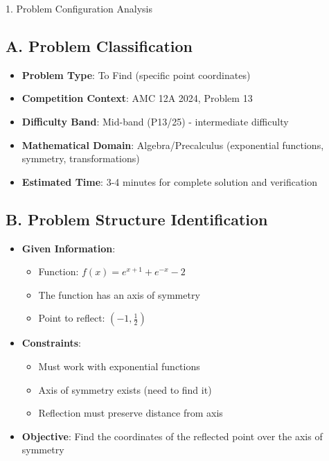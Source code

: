 \documentclass[12pt]{article}
\begin{document}
\begin{configbox}{1. Problem Configuration Analysis}

\subsection*{A. Problem Classification}
\begin{itemize}[leftmargin=*]
    \item \textbf{Problem Type}: To Find (specific point coordinates)
    \item \textbf{Competition Context}: AMC 12A 2024, Problem 13
    \item \textbf{Difficulty Band}: Mid-band (P13/25) - intermediate difficulty
    \item \textbf{Mathematical Domain}: Algebra/Precalculus (exponential functions, symmetry, transformations)
    \item \textbf{Estimated Time}: 3-4 minutes for complete solution and verification
\end{itemize}

\subsection*{B. Problem Structure Identification}
\begin{itemize}[leftmargin=*]
    \item \textbf{Given Information}: 
    \begin{itemize}
        \item Function: $f(x) = e^{x+1}+e^{-x}-2$
        \item The function has an axis of symmetry
        \item Point to reflect: $(-1, \frac{1}{2})$
    \end{itemize}
    
    \item \textbf{Constraints}: 
    \begin{itemize}
        \item Must work with exponential functions
        \item Axis of symmetry exists (need to find it)
        \item Reflection must preserve distance from axis
    \end{itemize}
    
    \item \textbf{Objective}: Find the coordinates of the reflected point over the axis of symmetry
    

\end{itemize}
\end{configbox}
\end{document}
